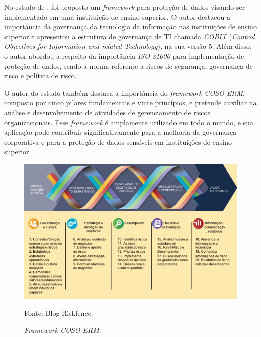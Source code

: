 \documentclass[
	12pt,				%
	openright,			%
	oneside,			%
	a4paper,			%
	english,			%
	french,				%
	spanish,			%
	brazil,				%
	]{abntex2}
\begin{document}

No estudo de , foi proposto um \textit{framework} para proteção de dados visando ser implementado em uma instituição de ensino superior. O autor destacou a importância da governança da tecnologia da informação nas instituições de ensino superior e apresentou a estrutura de governança de TI chamada \textit{COBIT} (\textit{Control Objectives for Information and related Technology}), na sua versão 5. Além disso, o autor abordou a respeito da importância \textit{ISO 31000} para implementação de proteção de dados, sendo a norma referente a riscos de segurança, governança de risco e política de risco.

O autor do estudo também destaca a importância do \textit{framework} \textit{COSO-ERM}, composto por cinco pilares fundamentais e vinte princípios, e pretende auxiliar na análise e desenvolvimento de atividades de gerenciamento de riscos organizacionais. Esse \textit{framework} é amplamente utilizado em todo o mundo, e sua aplicação pode contribuir significativamente para a melhoria da governança corporativa e para a proteção de dados sensíveis em instituições de ensino superior. 

\begin{figure}[ht]
    \centering
    \caption{\textit{Framework COSO-ERM}.}
    \includegraphics[width=6.9in]{Images/12Silva2020.png}
    \label{fig: 12Silva}
    
    \centering \small Fonte: Blog Riskfence.
\end{figure}

\pagebreak
\end{document}
